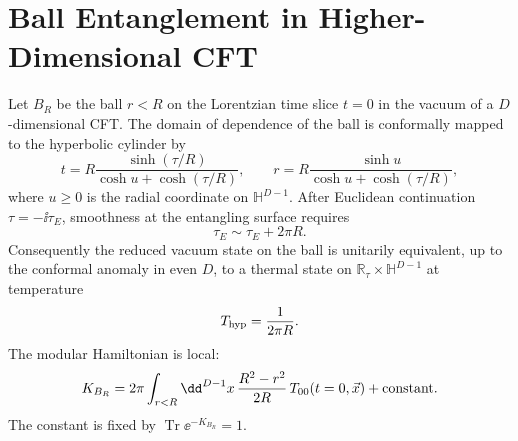 \section{Ball Entanglement in Higher-Dimensional CFT}

Let \(B_R\) be the ball \(r<R\) on the Lorentzian time slice \(t=0\) in the
vacuum of a \(D\)-dimensional CFT.  The domain of dependence of the ball is
conformally mapped to the hyperbolic cylinder by
\begin{equation}
  t
  =
  R\frac{\sinh(\tau/R)}{\cosh u+\cosh(\tau/R)},
  \qquad
  r
  =
  R\frac{\sinh u}{\cosh u+\cosh(\tau/R)},
  \label{eq:causal-diamond-hyperbolic-map}
\end{equation}
where \(u\geq0\) is the radial coordinate on \(\mathbb H^{D-1}\).  After
Euclidean continuation \(\tau=-\ii\tau_E\), smoothness at the entangling
surface requires
\[
  \tau_E\sim\tau_E+2\pi R .
\]
Consequently the reduced vacuum state on the ball is unitarily equivalent,
up to the conformal anomaly in even \(D\), to a thermal state on
\(\mathbb R_\tau\times\mathbb H^{D-1}\) at temperature
\[
  T_{\rm hyp}=\frac{1}{2\pi R}.
\]
The modular Hamiltonian is local:
\begin{equation}
  K_{B_R}
  =
  2\pi
  \int_{r<R}\dd^{D-1}x\,
  \frac{R^2-r^2}{2R}\,
  T_{00}(t=0,\vec x)
  +\hbox{constant}.
  \label{eq:ball-modular-hamiltonian}
\end{equation}
The constant is fixed by \(\operatorname{Tr}\ee^{-K_{B_R}}=1\).


